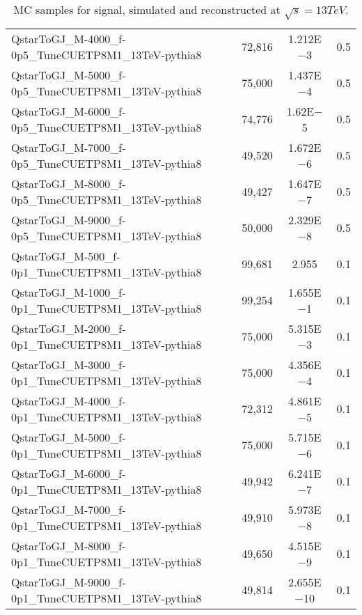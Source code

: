 \begin{table}[htbp]
\begin{center}
{\begin{tabular}{lccc}
        QstarToGJ\_M-4000\_f-0p5\_TuneCUETP8M1\_13TeV-pythia8  & 72,816  & 1.212E$-$3 & 0.5 \\
        QstarToGJ\_M-5000\_f-0p5\_TuneCUETP8M1\_13TeV-pythia8  & 75,000  & 1.437E$-$4 & 0.5 \\
        QstarToGJ\_M-6000\_f-0p5\_TuneCUETP8M1\_13TeV-pythia8  & 74,776  & 1.62E$-$5  & 0.5 \\
        QstarToGJ\_M-7000\_f-0p5\_TuneCUETP8M1\_13TeV-pythia8  & 49,520  & 1.672E$-$6 & 0.5 \\
        QstarToGJ\_M-8000\_f-0p5\_TuneCUETP8M1\_13TeV-pythia8  & 49,427  & 1.647E$-$7 & 0.5 \\
        QstarToGJ\_M-9000\_f-0p5\_TuneCUETP8M1\_13TeV-pythia8  & 50,000  & 2.329E$-$8 & 0.5 \\
        \midrule
        \midrule
        QstarToGJ\_M-500\_f-0p1\_TuneCUETP8M1\_13TeV-pythia8   & 99,681 & 2.955 & 0.1 \\
        QstarToGJ\_M-1000\_f-0p1\_TuneCUETP8M1\_13TeV-pythia8  & 99,254 & 1.655E$-$1 & 0.1 \\
        QstarToGJ\_M-2000\_f-0p1\_TuneCUETP8M1\_13TeV-pythia8  & 75,000 & 5.315E$-$3 & 0.1 \\
        QstarToGJ\_M-3000\_f-0p1\_TuneCUETP8M1\_13TeV-pythia8  & 75,000 & 4.356E$-$4 & 0.1 \\
        QstarToGJ\_M-4000\_f-0p1\_TuneCUETP8M1\_13TeV-pythia8  & 72,312 & 4.861E$-$5 & 0.1 \\
        QstarToGJ\_M-5000\_f-0p1\_TuneCUETP8M1\_13TeV-pythia8  & 75,000 & 5.715E$-$6 & 0.1 \\
        QstarToGJ\_M-6000\_f-0p1\_TuneCUETP8M1\_13TeV-pythia8  & 49,942 & 6.241E$-$7 & 0.1 \\
        QstarToGJ\_M-7000\_f-0p1\_TuneCUETP8M1\_13TeV-pythia8  & 49,910 & 5.973E$-$8 & 0.1 \\
        QstarToGJ\_M-8000\_f-0p1\_TuneCUETP8M1\_13TeV-pythia8  & 49,650 & 4.515E$-$9 & 0.1 \\
        QstarToGJ\_M-9000\_f-0p1\_TuneCUETP8M1\_13TeV-pythia8  & 49,814 & 2.655E$-$10 & 0.1 \\
        \bottomrule
      \end{tabular}
    }
    \caption{MC samples for \qstar signal, simulated and reconstructed at $\sqrt{s}=13\unit{TeV}$.}
    \label{Table:QstarSigSamples}
  \end{center}
\end{table}

